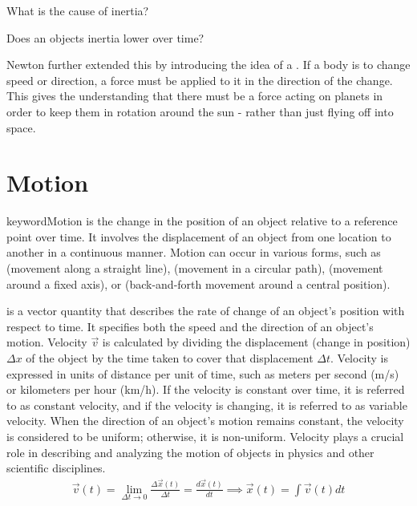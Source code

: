 \begin{questions}
	\item What is the cause of inertia?
 	\item Does an objects inertia lower over time?
\end{questions}

Newton further extended this by introducing the idea of a . If a body is to change speed or direction, a force must be applied to it in the direction of the change. This gives the understanding that there must be a force acting on planets in order to keep them in rotation around the sun - rather than just flying off into space.


















\section{Motion}

keyword{Motion} is the change in the position of an object relative to a reference point over time. It involves the displacement of an object from one location to another in a continuous manner. Motion can occur in various forms, such as  (movement along a straight line),  (movement in a circular path),  (movement around a fixed axis), or  (back-and-forth movement around a central position). 

 is a vector quantity that describes the rate of change of an object's position with respect to time. It specifies both the speed and the direction of an object's motion. Velocity $\vec{v}$ is calculated by dividing the displacement (change in position) $\Delta x$ of the object by the time taken to cover that displacement $\Delta t$. Velocity is expressed in units of distance per unit of time, such as meters per second (m/s) or kilometers per hour (km/h). If the velocity is constant over time, it is referred to as constant velocity, and if the velocity is changing, it is referred to as variable velocity. When the direction of an object's motion remains constant, the velocity is considered to be uniform; otherwise, it is non-uniform. Velocity plays a crucial role in describing and analyzing the motion of objects in physics and other scientific disciplines.
\begin{align}
\vec{v}(t)=\lim_{\Delta t \to 0}\frac{\Delta \vec{x}(t)}{\Delta t} = \frac{d\vec{x}(t)}{dt} \implies \vec{x}(t) = \int \vec{v}(t) dt
\end{align}

